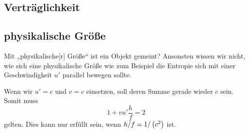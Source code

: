\fehlt

\subsection{Verträglichkeit}

\fehlt

\subsection{physikalische Größe}

Mit „physikalische[r] Größe“ ist ein Objekt gemeint? Ansonsten wissen wir
nicht, wie sich eine physikalische Größe wie zum Beispiel die Entropie sich mit
einer Geschwindigkeit $u'$ parallel bewegen sollte.

\fehlt

Wenn wir $u' = c$ und $v = c$ einsetzen, soll deren Summe gerade wieder $c$ sein. Somit muss
\[
	1 + v u' \frac hf = 2
\]
gelten. Dies kann nur erfüllt sein, wenn $h/f = 1/\del{c^2}$ ist.

\IfFileExists{\bibliographyfile}{
	
	
}{}




